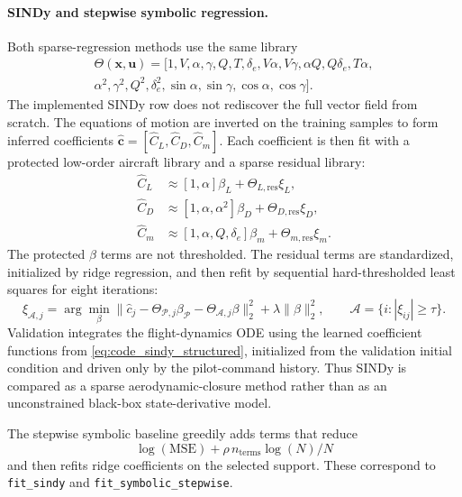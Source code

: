 \documentclass[11pt]{article}
\begin{document}
\paragraph{SINDy and stepwise symbolic regression.}
Both sparse-regression methods use the same library
\begin{multline}
\Theta(\mathbf{x},\mathbf{u})=
[1,V,\alpha,\gamma,Q,T,\delta_e,V\alpha,V\gamma,\alpha Q,Q\delta_e,
T\alpha,\\
\alpha^2,\gamma^2,Q^2,\delta_e^2,\sin\alpha,\sin\gamma,\cos\alpha,\cos\gamma].
\label{eq:code_sindy_library}
\end{multline}
The implemented SINDy row does not rediscover the full vector field from
scratch. The equations of motion are inverted on the training samples to form
inferred coefficients
$\widehat{\mathbf{c}}=[\widehat{C}_L,\widehat{C}_D,\widehat{C}_m]$. Each
coefficient is then fit with a protected low-order aircraft library and a sparse
residual library:
\begin{align}
    \widehat{C}_L &\approx
        [1,\alpha]\beta_L+\Theta_{L,\mathrm{res}}\xi_L,\\
    \widehat{C}_D &\approx
        [1,\alpha,\alpha^2]\beta_D+\Theta_{D,\mathrm{res}}\xi_D,\\
    \widehat{C}_m &\approx
        [1,\alpha,Q,\delta_e]\beta_m+\Theta_{m,\mathrm{res}}\xi_m.
        \label{eq:code_sindy_structured}
\end{align}
The protected $\beta$ terms are not thresholded. The residual terms are
standardized, initialized by ridge regression, and then refit by sequential
hard-thresholded least squares for eight iterations:
\begin{equation}
    \xi_{\mathcal{A},j}
    =
    \arg\min_\beta
    \|\widehat{c}_j-\Theta_{\mathcal{P},j}\beta_{\mathcal{P}}
      -\Theta_{\mathcal{A},j}\beta\|_2^2
    +\lambda\|\beta\|_2^2,
    \qquad
    \mathcal{A}=\{i:|\xi_{ij}|\ge\tau\}.
\end{equation}
Validation integrates the flight-dynamics ODE using the learned coefficient
functions from \eqref{eq:code_sindy_structured}, initialized from the validation
initial condition and driven only by the pilot-command history. Thus SINDy is
compared as a sparse aerodynamic-closure method rather than as an unconstrained
black-box state-derivative model.

The stepwise symbolic baseline greedily adds terms that reduce
\[
    \log(\mathrm{MSE})+
    \rho\,n_{\mathrm{terms}}\log(N)/N
\]
and then refits ridge coefficients on the selected support. These correspond to
\texttt{fit\_sindy} and \texttt{fit\_symbolic\_stepwise}.
\end{document}

